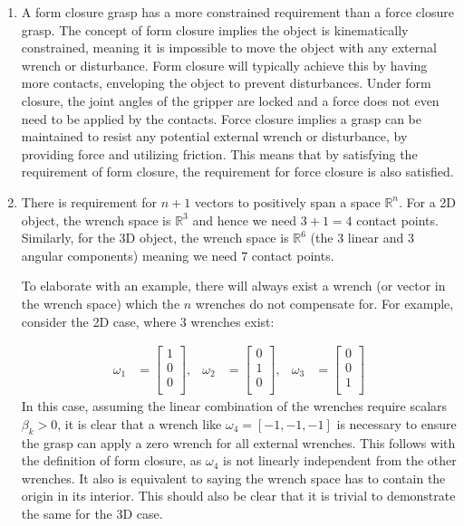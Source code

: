 \documentclass{article}
\begin{document}
\begin{enumerate}[label=(\roman*)]
\item
A form closure grasp has a more constrained requirement than a force closure grasp. The concept of form closure implies the object is kinematically constrained, meaning it is impossible to move the object with any external wrench or disturbance. Form closure will typically achieve this by having more contacts, enveloping the object to prevent disturbances. Under form closure, the joint angles of the gripper are locked and a force does not even need to be applied by the contacts. Force closure implies a grasp can be maintained to resist any potential external wrench or disturbance, by providing force and utilizing friction. This means that by satisfying the requirement of form closure, the requirement for force closure is also satisfied.
\item There is requirement for $n + 1$ vectors to positively span a space $\mathbb{R}^n$. For a 2D object, the wrench space is $\mathbb{R}^3$ and hence we need $3 + 1 = 4$ contact points. Similarly, for the 3D object, the wrench space is $\mathbb{R}^6$ (the 3 linear and 3 angular components) meaning we need $7$ contact points.

To elaborate with an example, there will always exist a wrench (or vector in the wrench space) which the $n$ wrenches do not compensate for. For example, consider the 2D case, where 3 wrenches exist:

\begin{align}
\omega_1 &= \begin{bmatrix}
1 \\
0 \\
0 \\
\end{bmatrix}, &
\omega_2 &= \begin{bmatrix}
0 \\
1 \\
0 \\
\end{bmatrix}, &
\omega_3 &= \begin{bmatrix}
0 \\
0 \\
1 \\
\end{bmatrix} 
\end{align}
In this case, assuming the linear combination of the wrenches require scalars $\beta_{k} > 0$, it is clear that a wrench like $\omega_4 = [-1, -1, -1]$ is necessary to ensure the grasp can apply a zero wrench for all external wrenches. This follows with the definition of form closure, as $\omega_4$ is not linearly independent from the other wrenches. It also is equivalent to saying the wrench space has to contain the origin in its interior. This should also be clear  that it is trivial to demonstrate the same for the 3D case.


\end{enumerate}
\end{document}
